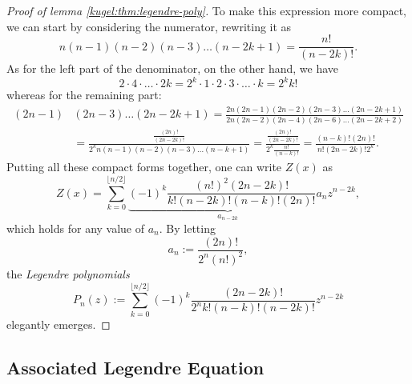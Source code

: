 \begin{proof}[Proof of lemma \ref{kugel:thm:legendre-poly}]
  To make this expression more compact, we can start by considering the numerator, rewriting it as
  \begin{equation*}
    n(n-1)(n-2)(n-3) \hdots (n-2k+1)
    = \frac{n!}{(n-2k)!}.
  \end{equation*}
  As for the left part of the denominator, on the other hand, we have
  \begin{equation*}
    2 \cdot 4 \cdot \hdots \cdot 2k = 2^k \cdot 1 \cdot 2 \cdot 3 \cdot \hdots \cdot k = 2^k k! 
  \end{equation*}
  whereas for the remaining part:
  \begin{align*}
    (2n-1) & (2n-3) \hdots (2n-2k+1) = \frac{
        2n(2n-1)(2n-2)(2n-3) \hdots (2n-2k+1)
      }{
        2n(2n-2)(2n-4)(2n-6) \hdots (2n-2k+2)
      }
      \\
      &= \frac{
        \frac{(2n)!}{(2n-2k)!}
      }{
        2^k n(n-1)(n-2)(n-3) \hdots (n-k+1)
      }
      = \frac{
        \frac{(2n)!}{(2n-2k)!}
      }{
        2^k \frac{n!}{(n-k)!}
      }
      = \frac{(n-k)!(2n)!}{n!(2n-2k)!2^k}.
  \end{align*}
  Putting all these compact forms together, one can write $Z(x)$ as
  \begin{equation*}
    Z(x) = \sum_{k=0}^{\lfloor n / 2\rfloor}
      \underbrace{
        (-1)^k \frac{(n!)^2(2n-2k)!}{k!(n-2k)!(n-k)!(2n)!} a_n
      }_{a_{n-2k}} z^{n-2k},
  \end{equation*}
  which holds for any value of $a_n$. By letting
  \begin{equation*}
    a_{n} := \frac{(2n)!}{2^n (n!)^2},
  \end{equation*}
  the \emph{Legendre polynomials}
  \begin{equation}
    P_n(z) := \sum_{k=0}^{\lfloor n/2 \rfloor}
      (-1)^k \frac{(2n-2k)!}{2^n k! (n-k)!(n-2k)!} z^{n-2k} 
  \end{equation}
  elegantly emerges.
\end{proof}

\subsection{Associated Legendre Equation}
\label{kugel:sec:proofs:associated-legendre}

